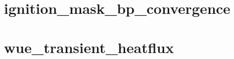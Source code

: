 \clearpage
\section{ignition\_mask\_bp\_convergence}


\clearpage
\section{wue\_transient\_heatflux}


